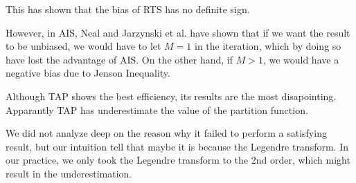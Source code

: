 This has shown that the bias of RTS has no definite sign.

However, in AIS, Neal and Jarzynski et al.\cite{neal2001annealed,nonequilibrium} have shown that if we want the result to be unbiased, we would have to let $M=1$ in the iteration, which by doing so have lost the advantage of AIS. On the other hand, if $M > 1$, we would have a negative bias due to Jenson Inequality.

Although TAP shows the best efficiency, its results are the most disapointing. Apparantly TAP has underestimate the value of the partition function.

We did not analyze deep on the reason why it failed to perform a satisfying result, but our intuition tell that maybe it is because the Legendre transform. In our practice, we only took the Legendre transform to the 2nd order, which might result in the underestimation.










